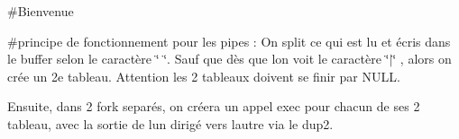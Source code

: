 \#\+Bienvenue

\#principe de fonctionnement pour les pipes \+: On split ce qui est lu et écris dans le buffer selon le caractère \char`\"{} \char`\"{}. Sauf que dès que l\textquotesingle{}on voit le caractère \char`\"{}$\vert$\char`\"{} , alors on crée un 2e tableau. Attention les 2 tableaux doivent se finir par NULL.

Ensuite, dans 2 fork separés, on créera un appel exec pour chacun de ses 2 tableau, avec la sortie de l\textquotesingle{}un dirigé vers l\textquotesingle{}autre via le dup2. 